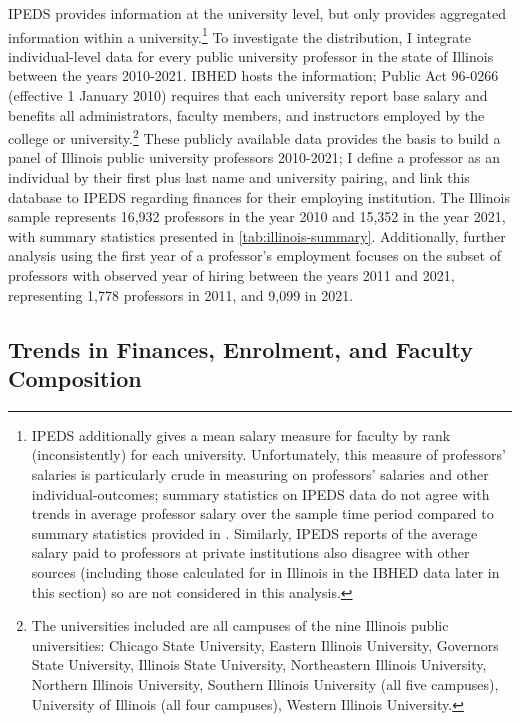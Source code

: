 IPEDS provides information at the university level, but only provides aggregated information within a university.\footnote{
    IPEDS additionally gives a mean salary measure for faculty by rank (inconsistently) for each university.
    Unfortunately, this measure of professors' salaries is particularly crude in measuring on professors' salaries and other individual-outcomes; summary statistics on IPEDS data do not agree with trends in average professor salary over the sample time period compared to summary statistics provided in \citealt{aau2021survey}.
    Similarly, IPEDS reports of the average salary paid to professors at private institutions also disagree with other sources (including those calculated for in Illinois in the IBHED data later in this section) so are not considered in this analysis.
}
To investigate the distribution, I integrate individual-level data for every public university professor in the state of Illinois between the years 2010-2021.
IBHED hosts the information;
Public Act 96-0266 (effective 1 January 2010) requires that each university report base salary and benefits all administrators, faculty members, and instructors employed by the college or university.\footnote{
    The universities included are all campuses of the nine Illinois public universities: Chicago State University, Eastern Illinois University, Governors State University, Illinois State University, Northeastern Illinois University, Northern Illinois University, Southern Illinois University  (all five campuses), University of Illinois (all four campuses), Western Illinois University.
}
These publicly available data provides the basis to build a panel of Illinois public university professors 2010-2021; I define a professor as an individual by their first plus last name and university pairing, and link this database to IPEDS regarding finances for their employing institution.
The Illinois sample represents 16,932 professors in the year 2010 and 15,352 in the year 2021, with summary statistics presented in \autoref{tab:illinois-summary}.
Additionally, further analysis using the first year of a professor's employment focuses on the subset of professors with observed year of hiring between the years 2011 and 2021, representing 1,778 professors in 2011, and 9,099 in 2021.

\subsection{Trends in Finances, Enrolment, and Faculty Composition}
\label{sec:trends}


